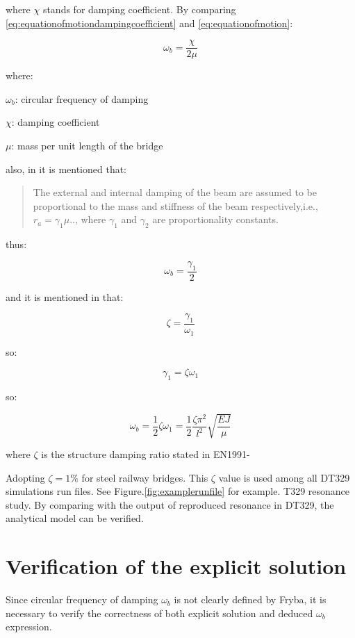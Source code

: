 \begin{appendices}
where $\chi$ stands for damping coefficient. By comparing \ref{eq:equationofmotiondampingcoefficient} and \ref{eq:equationofmotion}:

\begin{equation}
    \omega_b = \frac{\chi}{2\mu}
\end{equation}

where:

$\omega_b$: circular frequency of damping

$\chi$: damping coefficient

$\mu$: mass per unit length of the bridge

also, in \citet[Page.704]{abu2000vibration} it is mentioned that:

\begin{quote}
    The external and internal damping of the beam are assumed to be proportional to the mass and stiffness of the beam respectively,i.e., $r_a = \gamma_1 \mu$.., where $\gamma_1$ and $\gamma_2$ are proportionality constants.
\end{quote}

thus:


\begin{equation}
    \omega_b = \frac{\gamma_1}{2}
\end{equation}

and it is mentioned in \citet[Eq.8]{abu2000vibration} that:

$$\zeta = \frac{\gamma_1}{\omega_1}$$

so:

$$\gamma_1 = \zeta\omega_1$$

so:

$$\omega_b = \frac{1}{2}\zeta\omega_1 = \frac{1}{2}\frac{\zeta\pi^2}{l^2}\sqrt{\frac{EJ}{\mu}}$$

where $\zeta$ is the structure damping ratio stated in EN1991-

Adopting $\zeta = 1\%$ for steel railway bridges. This $\zeta$ value is used among all DT329 simulations run files. See Figure.\ref{fig:examplerunfile} for example.
T329 resonance study. By comparing with the output of reproduced resonance in DT329, the analytical model can be verified.

\section{Verification of the explicit solution}
Since circular frequency of damping $\omega_b$ is not clearly defined by Fryba, it is necessary to verify the correctness of both explicit solution and deduced $\omega_b$ expression.


\end{appendices}
